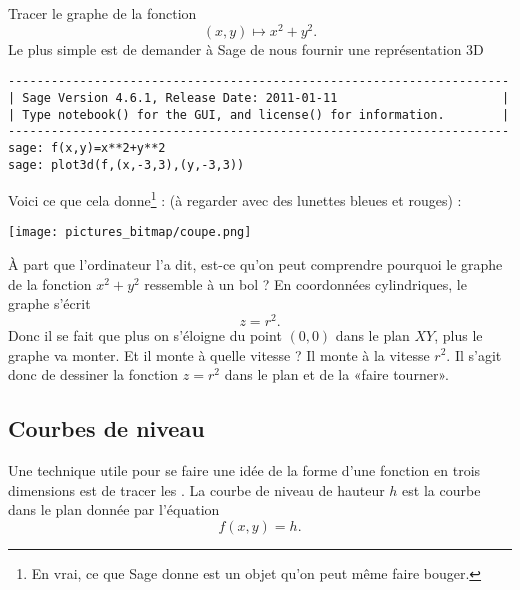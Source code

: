 \begin{example}     \label{ExempleTroisDxxyy}

	Tracer le graphe de la fonction
	\begin{equation}
		(x,y)\mapsto x^2+y^2.
	\end{equation}
	Le plus simple est de demander à Sage de nous fournir une représentation 3D
	\begin{verbatim}
----------------------------------------------------------------------
| Sage Version 4.6.1, Release Date: 2011-01-11                       |
| Type notebook() for the GUI, and license() for information.        |
----------------------------------------------------------------------
sage: f(x,y)=x**2+y**2
sage: plot3d(f,(x,-3,3),(y,-3,3))
    \end{verbatim}

	Voici ce que cela donne\footnote{En vrai, ce que Sage donne est un objet qu'on peut même faire bouger.} : (à regarder avec des lunettes bleues et rouges) :
	\begin{center}
		\texttt{[image: pictures\_bitmap/coupe.png]}
	\end{center}
	À part que l'ordinateur l'a dit, est-ce qu'on peut comprendre pourquoi le graphe de la fonction \( x^2+y^2\) ressemble à un bol ? En coordonnées cylindriques, le graphe s'écrit
	\begin{equation}
		z=r^2.
	\end{equation}
	Donc il se fait que plus on s'éloigne du point \( (0,0)\) dans le plan \( XY\), plus le graphe va monter. Et il monte à quelle vitesse ? Il monte à la vitesse \( r^2\). Il s'agit donc de dessiner la fonction \( z=r^2\) dans le plan et de la «faire tourner».

\end{example}

\subsection{Courbes de niveau}

Une technique utile pour se faire une idée de la forme d'une fonction en trois dimensions est de tracer les . La courbe de niveau de hauteur \( h\) est la courbe dans le plan donnée par l'équation
\begin{equation}
	f(x,y)=h.
\end{equation}

